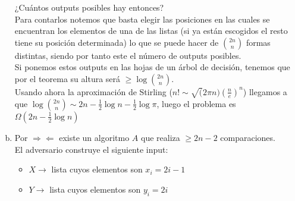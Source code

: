 \documentclass[dcc,uchile]{fcfmcourse}
\theoremstyle{plain}
\theoremstyle{definition}
\begin{document}
\begin{problems}
\begin{enumerate}[a)]
    ¿Cuántos outputs posibles hay entonces? \thinking \\
    Para contarlos notemos que basta elegir las posiciones en las cuales se encuentran los elementos de una de las listas (si ya están escogidos el resto tiene su posición determinada) lo que se puede hacer de $\binom{2n}{n}$ formas distintas, siendo por tanto este el número de outputs posibles.\\    
    Si ponemos estos outputs en las hojas de un árbol de decisión, tenemos que por el teorema \jewel su altura será $\ge \log \binom{2n}{n}$.\\    
    
    Usando ahora la aproximación de Stirling ($n! \sim \sqrt(2\pi n) \left(\frac{n}{e}\right)^n$) llegamos a que $\log \binom{2n}{n} \sim 2n - \frac{1}{2}\log n - \frac{1}{2}\log \pi$, luego el problema es $\Omega( 2n - \frac{1}{2}\log n)$
    \item Por $\Rightarrow \Leftarrow$ existe un algoritmo $A$ que realiza $\ge 2n-2$  comparaciones.\\
    
    El adversario \demon  construye el siguiente input:
    \begin{itemize}
        \item $X \rightarrow$ lista cuyos elementos son $x_{i} = 2i-1$
        \item $Y \rightarrow$ lista cuyos elementos son $y_{i} = 2i$
    \end{itemize}
    

\end{enumerate}
\end{problems}
\end{document}
